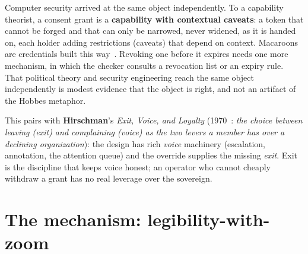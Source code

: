 \documentclass[11pt,a4paper]{article}
\theoremstyle{definition}
\theoremstyle{plain}
\begin{document}
\ifpdmargincolumn\pdconsentregion\fi
Computer security arrived at the same object independently. To a capability
theorist, a consent grant is a \textbf{capability with contextual caveats}: a
token that cannot be forged and that can only be narrowed, never widened, as
it is handed on, each holder adding restrictions (caveats) that depend on
context. Macaroons are credentials built this way~.
Revoking one before it expires needs one more mechanism, in which the checker
consults a revocation list or an expiry rule. That political theory and
security engineering reach the same object independently is modest evidence
that the object is right, and not an artifact of the Hobbes metaphor.

This pairs with \textbf{Hirschman}'s \emph{Exit, Voice, and Loyalty}
(1970~: \emph{the choice between leaving (exit) and
complaining (voice) as the two levers a member has over a declining organization}):
the design has rich \emph{voice} machinery (escalation, annotation, the attention
queue) and the override supplies the missing \emph{exit}. Exit is the discipline that keeps
voice honest; an operator who cannot cheaply withdraw a grant has no real leverage
over the sovereign.

\pdexercisepointer{\ref{ex:ls-express-vs-tacit-consent}}{\ref{ex:ls-ranker-counter-surface}}{\pageref{ex:ls-express-vs-tacit-consent}}

\section{The mechanism: legibility-with-zoom}\label{sec:zoom}
\end{document}
